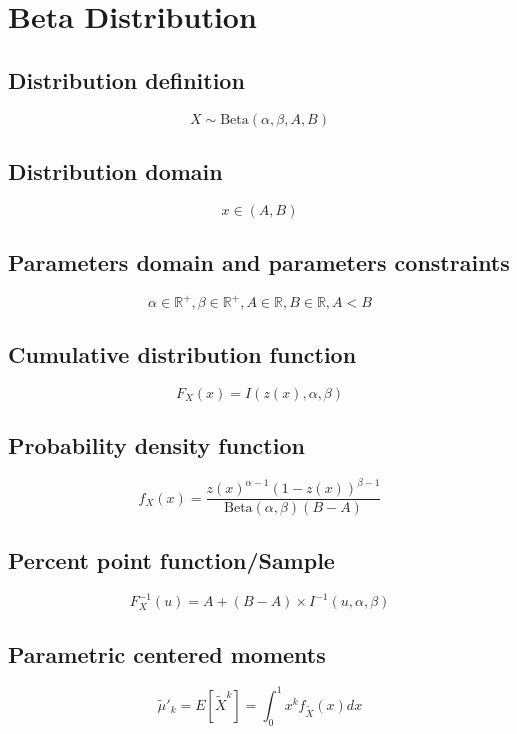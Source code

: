 \documentclass{article}
\begin{document}
\newpage
\section{Beta Distribution}
\subsection{Distribution definition}
\begin{equation*} X\sim\mathrm{Beta}\left(\alpha,\beta,A,B\right) \end{equation*}
\subsection{Distribution domain}
\begin{equation*} x\in\left(A,B\right) \end{equation*}
\subsection{Parameters domain and parameters constraints}
\begin{equation*} \alpha\in\mathbb{R}^{+}, \beta\in\mathbb{R}^{+}, A\in\mathbb{R}, B\in\mathbb{R}, A < B \end{equation*}
\subsection{Cumulative distribution function}
\begin{equation*} F_{X}\left(x\right)=I\left(z(x),\alpha,\beta\right) \end{equation*}
\subsection{Probability density function}
\begin{equation*} f_{X}\left(x\right)=\frac{z(x)^{\alpha-1}\left(1-z(x)\right)^{\beta-1}}{\text{Beta}(\alpha,\beta)(B-A)} \end{equation*}
\subsection{Percent point function/Sample}
\begin{equation*} F^{-1}_{X}\left(u\right)=A+(B-A)\times I^{-1}\left(u,\alpha,\beta\right) \end{equation*}
\subsection{Parametric centered moments}
\begin{equation*} \tilde{\mu}'_{k}=E[\tilde{X}^k]=\int_{0}^{1}x^{k}f_{\tilde{X}}\left(x\right)dx \end{equation*}
\end{document}
